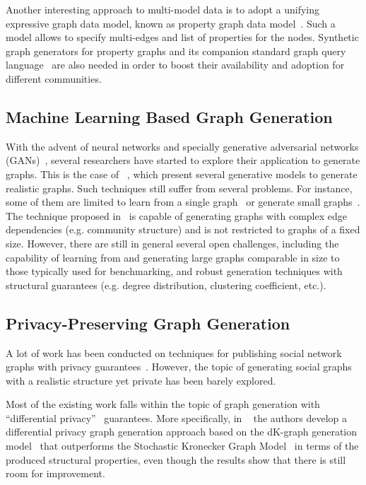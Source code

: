Another interesting approach to multi-model data is to adopt a unifying
expressive graph data model, known as property graph data
model~\cite{BFVY18}. Such a model allows to specify multi-edges and list of
properties for the nodes. Synthetic graph generators for property graphs and its
companion standard graph query language~\cite{Angles18,AnglesABBFGLPPS18} are also needed in order to boost
their availability and adoption for different communities.


\subsection{Machine Learning Based Graph Generation}

With the advent of neural networks and specially generative adversarial networks
(GANs)~\cite{goodfellow2014generative}, several researchers have started to
explore their application to generate graphs. This is the case of
~\cite{kipf2016variational,grover2018graphite,simonovsky2018graphvae,li2018learning,you2018graphrnn},
which present several generative models to generate realistic graphs.  Such
techniques still suffer from several problems. For instance, some of them are
limited to learn from a single
graph~\cite{kipf2016variational,grover2018graphite} or generate small
graphs~\cite{simonovsky2018graphvae,li2018learning,you2018graphrnn}. The
technique proposed in~\cite{you2018graphrnn} is capable of generating graphs
with complex edge dependencies (e.g. community structure) and is not restricted
to graphs of a fixed size. However, there are still in general several open
challenges, including the capability of learning from and generating large graphs comparable
in size to those typically used for benchmarking, and robust generation
techniques with structural guarantees (e.g. degree distribution, clustering
coefficient, etc.).

\subsection{Privacy-Preserving Graph Generation}

A lot of work has been conducted on techniques for publishing social network
graphs with privacy guarantees~\cite{wu2010survey}. However, the topic of
generating social graphs with a realistic structure yet private has been barely explored.

Most of the existing work falls within the topic of graph generation with ``differential
privacy''~\cite{dwork2009differential} guarantees. More specifically, in
~\cite{wang2013preserving} the authors develop a differential privacy graph
generation approach based on the dK-graph generation
model~\cite{mahadevan2006systematic} that outperforms the Stochastic Kronecker
Graph Model~\cite{Leskovec:2005:RMT:2101235.2101254} in terms of the produced structural properties,
even though the results show that there is still room for improvement.

